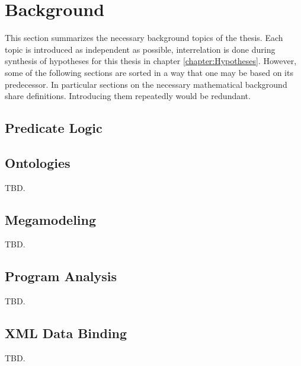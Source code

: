 \chapter{Background}
\label{chapter:Background}
This section summarizes the necessary background topics of the thesis.
Each topic is introduced as independent as possible, interrelation is done during synthesis of hypotheses for this thesis in chapter \ref{chapter:Hypotheses}.
However, some of the following sections are sorted in a way that one may be based on its predecessor.
In particular sections on the necessary mathematical background share definitions.
Introducing them repeatedly would be redundant.


\section{Predicate Logic}






\section{Ontologies}
TBD.

\section{Megamodeling}
TBD.

\subsection{\megal}
\subsubsection{\megalxtext}





\section{Program Analysis}
TBD.

\section{XML Data Binding}
TBD.


